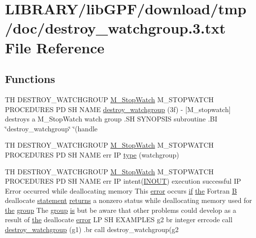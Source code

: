 \hypertarget{destroy__watchgroup_83_8txt}{}\section{L\+I\+B\+R\+A\+R\+Y/lib\+G\+P\+F/download/tmp/doc/destroy\+\_\+watchgroup.3.txt File Reference}
\label{destroy__watchgroup_83_8txt}
\subsection*{Functions}
\begin{DoxyCompactItemize}
\item 
TH D\+E\+S\+T\+R\+O\+Y\+\_\+\+W\+A\+T\+C\+H\+G\+R\+O\+UP \hyperlink{option__stopwatch_83_8txt_aa2011fc45a5e502e87ee50996a8a9305}{M\+\_\+\+Stop\+Watch} M\+\_\+\+S\+T\+O\+P\+W\+A\+T\+CH P\+R\+O\+C\+E\+D\+U\+R\+ES PD SH N\+A\+ME \hyperlink{destroy__watchgroup_83_8txt_a9d6e4dae97c8ce07a61d89382e7692e0}{destroy\+\_\+watchgroup} (3f) -\/ \mbox{[}\+M\+\_\+stopwatch\mbox{]} destroys a M\+\_\+\+Stop\+Watch watch group .\+S\+H S\+Y\+N\+O\+P\+S\+I\+S subroutine .\+B\+I \char`\"{}destroy\+\_\+watchgroup\char`\"{} \char`\"{}(handle
\item 
TH D\+E\+S\+T\+R\+O\+Y\+\_\+\+W\+A\+T\+C\+H\+G\+R\+O\+UP \hyperlink{option__stopwatch_83_8txt_aa2011fc45a5e502e87ee50996a8a9305}{M\+\_\+\+Stop\+Watch} M\+\_\+\+S\+T\+O\+P\+W\+A\+T\+CH P\+R\+O\+C\+E\+D\+U\+R\+ES PD SH N\+A\+ME err IP \hyperlink{destroy__watchgroup_83_8txt_ab623f536d615ff3d6357e73f12566b46}{type} (watchgroup)
\item 
TH D\+E\+S\+T\+R\+O\+Y\+\_\+\+W\+A\+T\+C\+H\+G\+R\+O\+UP \hyperlink{option__stopwatch_83_8txt_aa2011fc45a5e502e87ee50996a8a9305}{M\+\_\+\+Stop\+Watch} M\+\_\+\+S\+T\+O\+P\+W\+A\+T\+CH P\+R\+O\+C\+E\+D\+U\+R\+ES PD SH N\+A\+ME err IP intent(\hyperlink{M__stopwatch_83_8txt_aac11c70dd588f9c3fe71e95dbe89902f}{I\+N\+O\+UT}) execution successful IP Error occurred while deallocating memory This \hyperlink{M__stopwatch_83_8txt_ac4611edff506351be87ddb9adfc62315}{error} occurs \hyperlink{exit_87_8txt_a77395982f8d25581c808c40f3b634d90}{if} \hyperlink{M__stopwatch_83_8txt_a0f266597de2e57eb3aa964927bb30e14}{the} Fortran \hyperlink{intro__blas1_83_8txt_a5f157716d3fd55e7b7e08312dc859b58}{B} deallocate \hyperlink{M__stopwatch_83_8txt_a43758526aa61bbaa49faf1e287658350}{statement} \hyperlink{M__stopwatch_83_8txt_aee54cdd5349bf498aa96e7f9426a0717}{returns} a nonzero status while deallocating memory used for \hyperlink{M__stopwatch_83_8txt_a0f266597de2e57eb3aa964927bb30e14}{the} \hyperlink{M__stopwatch_83_8txt_a80fa32a76a22835e3c85462b2803875c}{group} The \hyperlink{M__stopwatch_83_8txt_a80fa32a76a22835e3c85462b2803875c}{group} \hyperlink{intro__blas1_83_8txt_a42a91df93f840595de3019ceb5d1df23}{is} but be aware that other problems could develop as a result of \hyperlink{M__stopwatch_83_8txt_a0f266597de2e57eb3aa964927bb30e14}{the} deallocate \hyperlink{M__stopwatch_83_8txt_ac4611edff506351be87ddb9adfc62315}{error} LP SH E\+X\+A\+M\+P\+L\+ES g2 br integer errcode call \hyperlink{destroy__watchgroup_83_8txt_abf3141ab5cad3784399faea5f2934f2a}{destroy\+\_\+watchgroup} (g1) .br call destroy\+\_\+watchgroup(g2

\end{DoxyCompactItemize}
